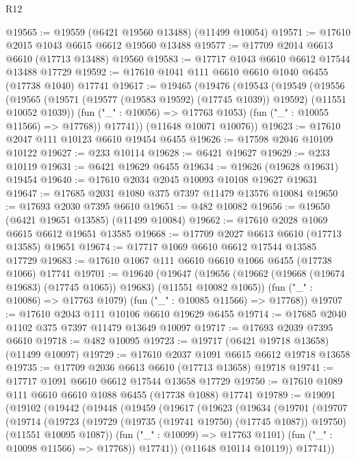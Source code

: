 \begin{lexlean}{R12}
\begin{coremodule}
{{{{{{{{{{{{{{{{{{{{{{{{{{{{{{{{{{{{{{{{{{{{{{{{{{{{{{{{{{{{{{{{{{{{{{{{{{{{{{{{{{@19565 := @19559 (@6421 @19560 @13488) (@11499 @10054)
@19571 := @17610 @2015 @1043 @6615 @6612 @19560 @13488
@19577 := @17709 @2014 @6613 @6610 (@17713 @13488) @19560
@19583 := @17717 @1043 @6610 @6612 @17544 @13488 @17729
@19592 := @17610 @1041 @111 @6610 @6610 @1040 @6455 (@17738 @1040) @17741
@19617 := @19465
    (@19476
      (@19543
        (@19549
          (@19556
            (@19565 (@19571 (@19577 (@19583 @19592) (@17745 @1039)) @19592) (@11551 @10052 @1039))
            (fun ("_" : @10056) => @17763 @1053)
            (fun ("_" : @10055 @11566) => @17768))
          @17741))
      (@11648 @10071 @10076))
@19623 := @17610 @2047 @111 @10123 @6610 @19454 @6455
@19626 := @17598 @2046 @10109 @10122
@19627 := @233 @10114
@19628 := @6421 @19627
@19629 := @233 @10119
@19631 := @6421 @19629 @6455
@19634 := @19626 (@19628 @19631) @19454
@19640 := @17610 @2034 @2045 @10093 @10108 @19627 @19631
@19647 := @17685 @2031 @1080 @375 @7397 @11479 @13576 @10084
@19650 := @17693 @2030 @7395 @6610
@19651 := @482 @10082
@19656 := @19650 (@6421 @19651 @13585) (@11499 @10084)
@19662 := @17610 @2028 @1069 @6615 @6612 @19651 @13585
@19668 := @17709 @2027 @6613 @6610 (@17713 @13585) @19651
@19674 := @17717 @1069 @6610 @6612 @17544 @13585 @17729
@19683 := @17610 @1067 @111 @6610 @6610 @1066 @6455 (@17738 @1066) @17741
@19701 := @19640
    (@19647
      (@19656 (@19662 (@19668 (@19674 @19683) (@17745 @1065)) @19683) (@11551 @10082 @1065))
      (fun ("_" : @10086) => @17763 @1079)
      (fun ("_" : @10085 @11566) => @17768))
@19707 := @17610 @2043 @111 @10106 @6610 @19629 @6455
@19714 := @17685 @2040 @1102 @375 @7397 @11479 @13649 @10097
@19717 := @17693 @2039 @7395 @6610
@19718 := @482 @10095
@19723 := @19717 (@6421 @19718 @13658) (@11499 @10097)
@19729 := @17610 @2037 @1091 @6615 @6612 @19718 @13658
@19735 := @17709 @2036 @6613 @6610 (@17713 @13658) @19718
@19741 := @17717 @1091 @6610 @6612 @17544 @13658 @17729
@19750 := @17610 @1089 @111 @6610 @6610 @1088 @6455 (@17738 @1088) @17741
@19789 := @19091
    (@19102
      (@19442
        (@19448
          (@19459
            (@19617
              (@19623
                (@19634
                  (@19701
                    (@19707
                      (@19714
                        (@19723
                          (@19729 (@19735 (@19741 @19750) (@17745 @1087)) @19750)
                          (@11551 @10095 @1087))
                        (fun ("_" : @10099) => @17763 @1101)
                        (fun ("_" : @10098 @11566) => @17768))
                      @17741))
                  (@11648 @10114 @10119))
                @17741))
}}}}}}}}}}}}}}}}}}}}}}}}}}}}}}}}}}}}}}}}}}}}}}}}}}}}}}}}}}}}}}}}}}}}}}}}}}}}}}}}}}
\end{coremodule}
\end{lexlean}
